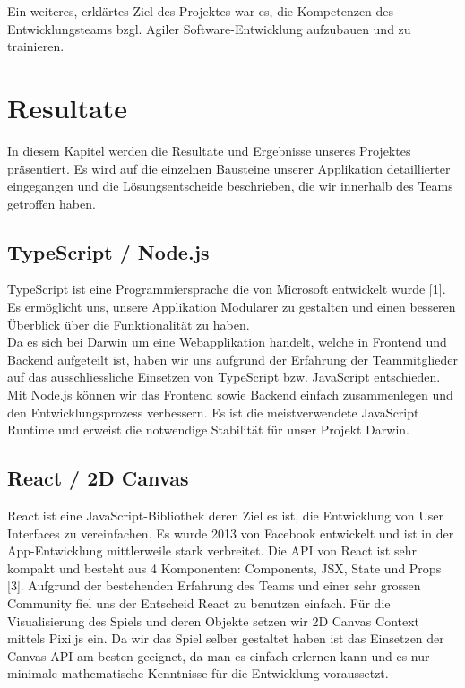 \documentclass[11pt,a4paper,titlepage]{article}
\begin{document}
Ein weiteres, erklärtes Ziel des Projektes war es, die Kompetenzen des Entwicklungsteams bzgl. Agiler Software-Entwicklung aufzubauen und zu trainieren.

\newpage

\section{Resultate}
In diesem Kapitel werden die Resultate und Ergebnisse unseres Projektes präsentiert.
Es wird auf die einzelnen Bausteine unserer Applikation detaillierter eingegangen und die Lösungsentscheide beschrieben, die wir innerhalb des Teams getroffen haben.

\subsection{TypeScript / Node.js}
TypeScript ist eine Programmiersprache die von Microsoft entwickelt wurde [1]. Es ermöglicht uns, unsere Applikation Modularer zu gestalten und einen besseren Überblick über die Funktionalität zu haben.\\
Da es sich bei Darwin um eine Webapplikation handelt, welche in Frontend und Backend aufgeteilt ist, haben wir uns aufgrund der Erfahrung der Teammitglieder auf das ausschliessliche Einsetzen von TypeScript bzw. JavaScript entschieden.
Mit Node.js können wir das Frontend sowie Backend einfach zusammenlegen und den Entwicklungsprozess verbessern. Es ist die meistverwendete JavaScript Runtime und erweist die notwendige Stabilität für unser Projekt Darwin.

\subsection{React / 2D Canvas}
React ist eine JavaScript-Bibliothek deren Ziel es ist, die Entwicklung von User Interfaces zu vereinfachen. Es wurde 2013 von Facebook entwickelt und ist in der App-Entwicklung mittlerweile stark verbreitet.
Die API von React ist sehr kompakt und besteht aus 4 Komponenten: Components, JSX, State und Props [3].
Aufgrund der bestehenden Erfahrung des Teams und einer sehr grossen Community fiel uns der Entscheid React zu benutzen einfach.
Für die Visualisierung des Spiels und deren Objekte setzen wir 2D Canvas Context mittels Pixi.js ein. Da wir das Spiel selber gestaltet haben ist das Einsetzen der Canvas API am besten geeignet, da man es einfach erlernen kann und es nur minimale mathematische Kenntnisse für die Entwicklung voraussetzt.
\end{document}
